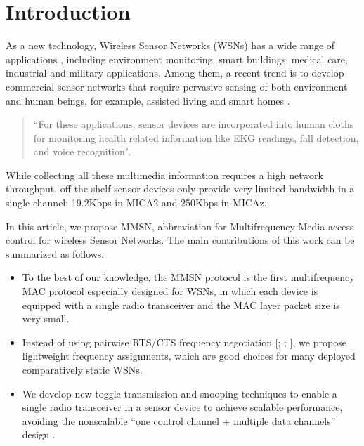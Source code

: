 \documentclass[prodmode,acmtecs]{acmsmall}
\begin{document}
\maketitle


\section{Introduction}

As a new technology, Wireless Sensor Networks (WSNs) has a wide
range of applications \cite{Culler-01,Bahl-02,Akyildiz-01}, including
environment monitoring, smart buildings, medical care, industrial and
military applications. Among them, a recent trend is to develop
commercial sensor networks that require pervasive sensing of both
environment and human beings, for example, assisted living
\cite{Akyildiz-02,Harvard-01,CROSSBOW} and smart homes
\cite{Harvard-01,Adya-01,CROSSBOW}.
\begin{quote}
``For these applications, sensor devices are incorporated into human
cloths \cite{Natarajan-01,Zhou-06,Bahl-02,Adya-01} for monitoring
health related information like EKG readings, fall detection, and voice recognition".
\end{quote}
While collecting all these multimedia information
\cite{Akyildiz-02} requires a high network throughput, off-the-shelf
sensor devices only provide very limited bandwidth in a single
channel: 19.2Kbps in MICA2 \cite{Bahl-02} and 250Kbps in MICAz.

In this article, we propose MMSN, abbreviation for Multifrequency
Media access control for wireless Sensor Networks. The main
contributions of this work can be summarized as follows.
\begin{itemize}
\item To the best of our knowledge, the MMSN protocol is the first
multifrequency MAC protocol especially designed for WSNs, in which
each device is equipped with a single radio transceiver and
the MAC layer packet size is very small.
\item Instead of using pairwise RTS/CTS frequency negotiation
[; ; ],
we propose lightweight frequency assignments, which are good choices
for many deployed comparatively static WSNs.
\item We develop new toggle transmission and snooping techniques to
enable a single radio transceiver in a sensor device to achieve
scalable performance, avoiding the nonscalable ``one
control channel + multiple data channels'' design \cite{Natarajan-01}.
\end{itemize}
\end{document}
